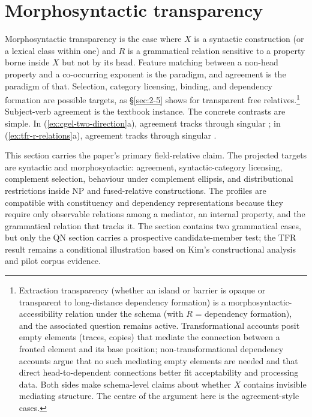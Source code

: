 \section{Morphosyntactic transparency}\label{sec:2}

Morphosyntactic transparency is the case where $X$ is a syntactic construction (or a lexical class within one) and $R$ is a grammatical relation sensitive to a property borne inside $X$ but not by its head. Feature matching between a non-head property and a co-occurring exponent is the paradigm, and agreement is the paradigm of that. Selection, category licensing, binding, and dependency formation are possible targets, as §\ref{sec:2-5} shows for transparent free relatives.\footnote{Extraction transparency (whether an island or barrier is opaque or transparent to long-distance dependency formation) is a morphosyntactic-accessibility relation under the schema (with $R$ = dependency formation), and the associated question remains active. Transformational accounts posit empty elements (traces, copies) that mediate the connection between a fronted element and its base position; non-transformational dependency accounts \autocite{gibson2025,dacunha-gibson-2025-syntactic-complexity} argue that no such mediating empty elements are needed and that direct head-to-dependent connections better fit acceptability and processing data. Both sides make schema-level claims about whether $X$ contains invisible mediating structure. The centre of the argument here is the agreement-style cases.} Subject-verb agreement is the textbook instance. The concrete contrasts are simple. In (\ref{ex:cgel-two-direction}a), agreement tracks  through singular ; in (\ref{ex:tfr-r-relations}a), agreement tracks  through singular .

This section carries the paper's primary field-relative claim. The projected targets are syntactic and morphosyntactic: agreement, syntactic-category licensing, complement selection, behaviour under complement ellipsis, and distributional restrictions inside NP and fused-relative constructions. The profiles are compatible with constituency and dependency representations because they require only observable relations among a mediator, an internal property, and the grammatical relation that tracks it. The section contains two grammatical cases, but only the QN section carries a prospective candidate-member test; the TFR result remains a conditional illustration based on Kim's constructional analysis and pilot corpus evidence.

